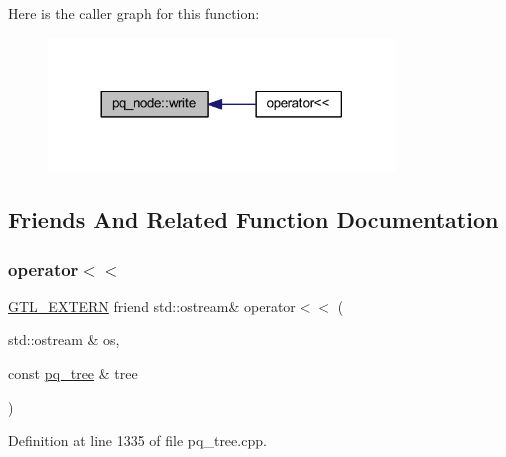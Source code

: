 Here is the caller graph for this function\+:\nopagebreak
\begin{figure}[H]
\begin{center}
\leavevmode
\includegraphics[width=260pt]{classpq__node_aab7bddb053b6b25b90be00cba7de97f9_icgraph}
\end{center}
\end{figure}


\subsection{Friends And Related Function Documentation}
\mbox{\label{classpq__node_a2db830bf75339bd39c819c231c03769b}} 
\subsubsection{\texorpdfstring{operator$<$$<$}{operator<<}}
{\footnotesize\ttfamily \mbox{\hyperlink{_g_t_l_8h_a014cd1e9b3e67a78ae433eda95c8fd25}{G\+T\+L\+\_\+\+E\+X\+T\+E\+RN}} friend std\+::ostream\& operator$<$$<$ (\begin{DoxyParamCaption}\item[{std\+::ostream \&}]{os,  }\item[{const \mbox{\hyperlink{classpq__tree}{pq\+\_\+tree}} \&}]{tree }\end{DoxyParamCaption})\hspace{0.3cm}{\ttfamily [friend]}}



Definition at line 1335 of file pq\+\_\+tree.\+cpp.


